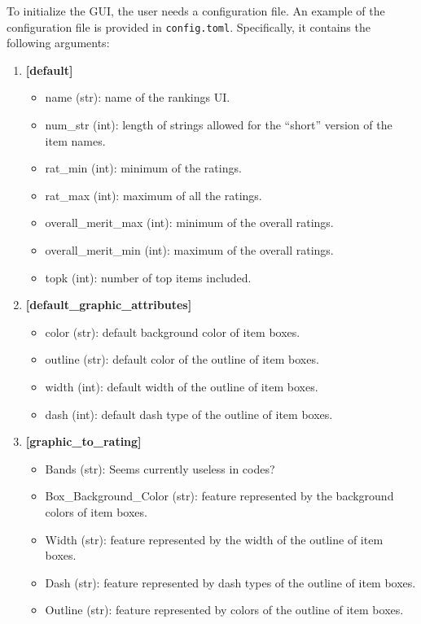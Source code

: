 \documentclass[a4paper,11pt]{memoir}
\begin{document}
To initialize the GUI, the user needs a configuration file. 
An example of the configuration file is provided in \texttt{config.toml}.
Specifically, it contains the following arguments:
\begin{enumerate}
  \item \textbf{[default]}
  \begin{itemize}
    \item name (str): name of the rankings UI.
    \item num\_str (int): length of strings allowed for the ``short'' version of the item names.
    \item rat\_min (int): minimum of the ratings.
    \item rat\_max (int): maximum of all the ratings.
    \item overall\_merit\_max (int): minimum of the overall ratings.
    \item overall\_merit\_min (int): maximum of the overall ratings.
    \item topk (int): number of top items included.
  \end{itemize}

  \item \textbf{[default\_graphic\_attributes]}
   \begin{itemize}
    \item color (str): default background color of item boxes.
    \item outline (str): default color of the outline of item boxes.
    \item width (int): default width of the outline of item boxes.
    \item dash (int): default dash type of the outline of item boxes.
      \end{itemize}


  \item \textbf{[graphic\_to\_rating]}
   \begin{itemize}
    \item Bands (str): {\color{red} Seems currently useless in codes?}
    \item Box\_Background\_Color (str): feature represented by the background colors of item boxes.
    \item Width (str): feature represented by the width of the outline of item boxes.
    \item Dash (str): feature represented by dash types of the outline of item boxes.
    \item Outline (str): feature represented by colors of the outline of item boxes.
      \end{itemize}



\end{enumerate}
\end{document}
